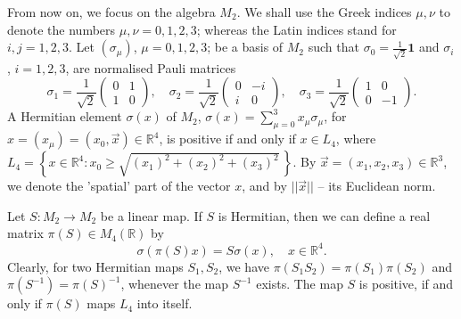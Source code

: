 \documentclass[12pt]{article}
\theoremstyle{plain}
\theoremstyle{definition}
\theoremstyle{remark}
\numberwithin{equation}{section}
\begin{document}
From now on, we focus on the algebra $M_{2}$.
We shall use the Greek indices $\mu, \nu$ to denote the numbers
$\mu,\nu = 0,1,2,3$;
whereas the Latin indices stand for
$i,j = 1,2,3$.
Let $(\sigma_{\mu})$, $\mu = 0, 1, 2, 3$;
be a basis of $M_{2}$
such that $\sigma_{0} = \tfrac{1}{\sqrt{2}}  \mathbf{1}$ and
$\sigma_{i}$, $i=1,2,3$,
are normalised Pauli matrices
 \begin{equation}
  \sigma_{1} = \frac{1}{\sqrt{2}} \begin{pmatrix}
            0 & 1 \\ 1 & 0
               \end{pmatrix},
 \quad
 \sigma_{2} = \frac{1}{\sqrt{2}}  \begin{pmatrix}
            0 & -i \\ i & 0
               \end{pmatrix},
 \quad
 \sigma_{3} = \frac{1}{\sqrt{2}}  \begin{pmatrix}
            1 & 0 \\ 0 & -1
               \end{pmatrix}.
 \end{equation}
A Hermitian element $\sigma(x)$ of $M_{2}$,
$\sigma(x) = \sum_{\mu =0}^{3} x_{\mu} \sigma_{\mu}$,
for $x = (x_{\mu}) = (x_{0}, \vec{x}) \in \mathbb{R}^{4}$,
is positive if and only if $x \in L_{4}$,
where
$ L_{4} = \left \{
            x \in \mathbb{R}^{4} :
            x_{0} \geq \sqrt{(x_{1})^{2} + (x_{2})^{2} + (x_{3})^{2}} \,
        \right \}$.
By $\vec{x} = (x_{1}, x_{2}, x_{3}) \in \mathbb{R}^{3}$,
we denote the 'spatial' part of the vector $x$,
and by $||\vec{x}||$ -- its Euclidean norm.

Let $S: M_{2} \rightarrow M_{2}$ be a linear map.
If $S$ is Hermitian,
then we can define a real matrix $\pi(S) \in M_{4}(\mathbb{R})$ by
\begin{equation}
\label{RandomLabel:365828}
  \sigma(\pi(S) x) = S \sigma(x), \quad x \in \mathbb{R}^{4}.
\end{equation}
Clearly, for two Hermitian maps $S_{1}, S_{2}$, we have
$\pi(S_{1} S_{2}) = \pi(S_{1}) \pi(S_{2})$
and $\pi(S^{-1}) = \pi(S)^{-1}$, whenever the map $S^{-1}$ exists.
The map $S$ is positive,
if and only if
$\pi(S)$ maps $L_{4}$ into itself.
\end{document}
